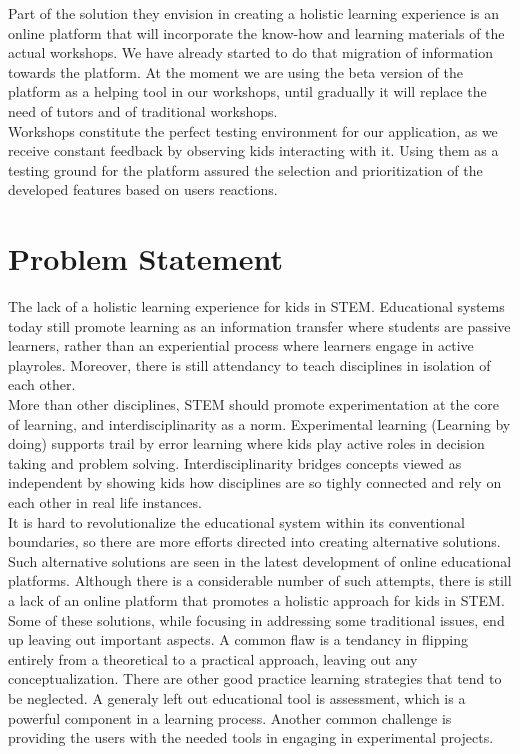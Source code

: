 Part of the solution they envision in creating a holistic learning experience is an online platform that will incorporate the know-how and learning materials of the actual workshops. We have already started to do that migration of information towards the platform. At the moment we are using the beta version of the platform as a helping tool in our workshops, until gradually it will replace the need of tutors and of traditional workshops. \\

Workshops constitute the perfect testing environment for our application, as we receive constant feedback by observing kids interacting with it. Using them as a testing ground for the platform assured the selection and prioritization of the developed features based on users reactions.


\section{Problem Statement}

The lack of a holistic learning experience for kids in STEM.
Educational systems today still promote learning as an information transfer where students are passive learners, rather than an experiential process where learners engage in active playroles. Moreover, there is still attendancy to teach disciplines in isolation of each other.\\

More than other disciplines, STEM should promote experimentation at the core of learning, and interdisciplinarity as a norm. Experimental learning (Learning by doing) supports trail by error learning where kids play active roles in decision taking and problem solving. Interdisciplinarity bridges concepts viewed as independent by showing kids how disciplines are so tighly connected and rely on each other in real life instances. \\

It is hard to revolutionalize the educational system within its conventional boundaries, so there are more efforts directed into creating alternative solutions. Such alternative solutions are seen in the latest development of online educational platforms. Although there is a considerable number of such attempts, there is still a lack of an online platform that promotes a holistic approach for kids in STEM.\\

Some of these solutions, while focusing in addressing some traditional issues, end up leaving out important aspects. A common flaw is a tendancy in flipping entirely from a theoretical to a practical approach, leaving out any conceptualization. 
There are other good practice learning strategies that tend to be neglected. A generaly left out educational tool is assessment, which is a powerful component in a learning process.
Another common challenge is providing the users with the needed tools in engaging in experimental projects. \\

